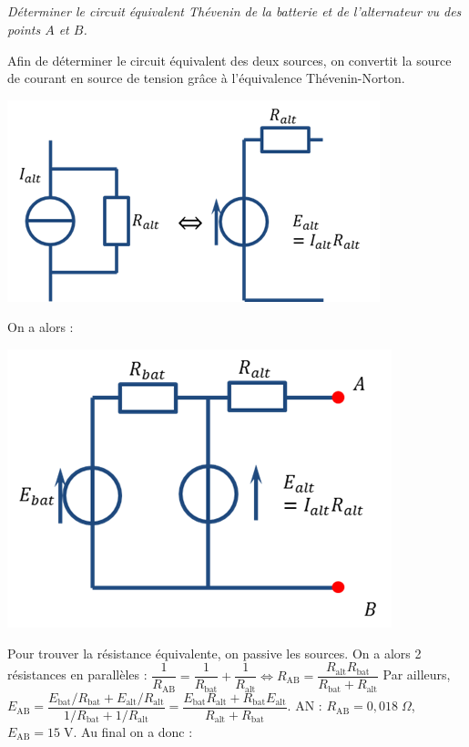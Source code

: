 \documentclass[10pt,fleqn]{book} %
\begin{document}
\begin{multicols}{2}
\subparagraph{}
\textit{Déterminer le circuit équivalent Thévenin de la batterie et de l’alternateur vu des points $A$ et $B$.}
\ifprof
\begin{corrige}
Afin de déterminer le circuit équivalent des deux sources, on convertit la source de courant en source de tension grâce à l’équivalence Thévenin-Norton.

\begin{center}
\includegraphics[width=.9\linewidth]{images/cor_02}
\end{center}

On a alors : 

\begin{center}
\includegraphics[width=.9\linewidth]{images/cor_03}
\end{center}
 
Pour trouver la résistance équivalente, on passive les sources. On a alors 2 résistances en parallèles : 
$\dfrac{1}{R_\text{AB}} =\dfrac{1}{R_\text{bat}} +\dfrac{1}{R_\text{alt}} \Longleftrightarrow R_\text{AB}=\dfrac{R_\text{alt} R_\text{bat}}{R_\text{bat}+R_\text{alt}}$
Par ailleurs, $ E_\text{AB}=\dfrac{E_\text{bat}/R_\text{bat} +E_\text{alt}/R_\text{alt} }{1/R_\text{bat} +1/R_\text{alt} }=\dfrac{E_\text{bat} R_\text{alt}+R_\text{bat} E_\text{alt}}{R_\text{alt}+R_\text{bat} }$. 
AN : $R_\text{AB}=0,018 \;\Omega$, $E_\text{AB}=15 \; \text{V}$.
Au final on a donc :


\end{corrige}
\end{multicols}
\end{document}
